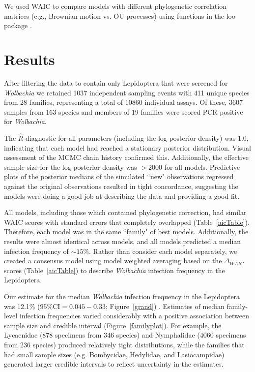 \documentclass{frontiersSCNS}
\begin{document}
We used WAIC \citep[the widely applicable or Watanabe-Akaike information criterion;][]{Watanabe:2010aa,Gelman:2014aa} to compare models with different phylogenetic correlation matrices (e.g., Brownian motion vs. OU processes) using functions in the loo package \citep{Vehtari:2016aa}. 

\section{Results}
After filtering the \citet{Weinert:2015aa} data to contain only Lepidoptera that were screened for \textit{Wolbachia} we retained 1037 independent sampling events with 411 unique species from 28 families, representing a total of 10860 individual assays. Of these, 3607 samples from 163 species and members of 19 families were scored PCR positive for \textit{Wolbachia}. 

The $\hat{R}$ diagnostic for all parameters (including the log-posterior density) was 1.0, indicating that each model had reached a stationary posterior distribution. Visual assessment of the MCMC chain history confirmed this. Additionally, the effective sample size for the log-posterior density was $> 2000$ for all models. Predictive plots of the posterior medians of the simulated ``new" observations regressed against the original observations resulted in tight concordance, suggesting the models were doing a good job at describing the data and providing a good fit. %

All models, including those which contained phylogenetic correction, had similar WAIC scores with standard errors that completely overlapped (Table~\ref{aicTable}).  Therefore, each model was in the same ``family" of best models. Additionally, the results were almost identical across models, and all models predicted a median infection frequency of $\sim 15\%$. Rather than consider each model separately, we created a consensus model using model weighted averaging based on the $\Delta_{WAIC}$ scores (Table~\ref{aicTable}) to describe \emph{Wolbachia} infection frequency in the Lepidoptera. 

Our estimate for the median \emph{Wolbachia} infection frequency in the Lepidoptera was 12.1\% ($95\% \mathrm{CI} = 0.045 - 0.33$; Figure~\ref{grand}) . Estimates of median family-level infection frequencies varied considerably with a positive association between sample size and credible interval (Figure~\ref{familyplot}). For example, the Lycaenidae (878 specimens from 346 species) and Nymphalidae (4060 specimens from 236 species) produced relatively tight distributions, while the families that had small sample sizes (e.g. Bombycidae, Hedylidae, and Lasiocampidae) generated larger credible intervals to reflect uncertainty in the estimates. 
\end{document}

